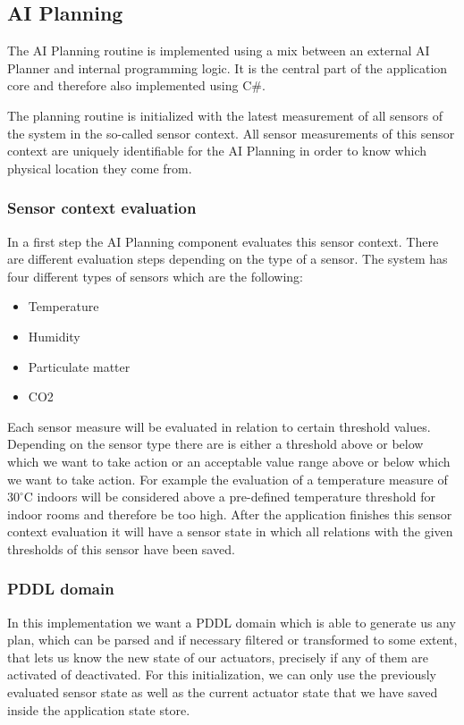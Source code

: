 \subsection{AI Planning}
The AI Planning routine is implemented using a mix between an external AI Planner and internal programming logic. It is the central part of the application core and therefore also implemented using C\#.

The planning routine is initialized with the latest measurement of all sensors of the system in the so-called sensor context. All sensor measurements of this sensor context are uniquely identifiable for the AI Planning in order to know which physical location they come from.

\subsubsection{Sensor context evaluation}
In a first step the AI Planning component evaluates this sensor context. There are different evaluation steps depending on the type of a sensor. The system has four different types of sensors which are the following:
\begin{itemize}
    \item Temperature
    \item Humidity
    \item Particulate matter
    \item CO2
\end{itemize}

Each sensor measure will be evaluated in relation to certain threshold values. Depending on the sensor type there are is either a threshold above or below which we want to take action or an acceptable value range above or below which we want to take action. For example the evaluation of a temperature measure of $30^\circ$C indoors will be considered above a pre-defined temperature threshold for indoor rooms and therefore be too high. After the application finishes this sensor context evaluation it will have a sensor state in which all relations with the given thresholds of this sensor have been saved.

\subsubsection{PDDL domain}
In this implementation we want a PDDL domain which is able to generate us any plan, which can be parsed and if necessary filtered or transformed to some extent, that lets us know the new state of our actuators, precisely if any of them are activated of deactivated. For this initialization, we can only use the previously evaluated sensor state as well as the current actuator state that we have saved inside the application state store.

